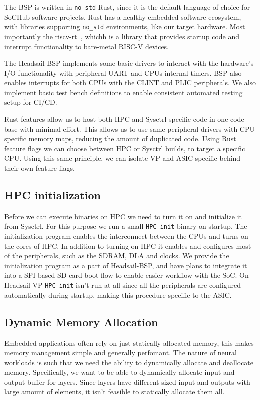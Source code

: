 \documentclass[12pt,a4paper,english
]{tunithesis}
\begin{document}
The BSP is written in \texttt{no\_std} Rust, since it is the default language of choice for SoCHub software projects. Rust has a healthy embedded software ecosystem, with libraries supporting \texttt{no\_std} environments, like our target hardware. Most importantly the riscv-rt~\cite{riscv_rt}, whichh is a library that provides startup code and interrupt functionality to bare-metal RISC-V devices.

The Headsail-BSP implements some basic drivers to interact with the hardware's I/O functionality with peripheral UART and CPUs internal timers. BSP also enables interrupts for both CPUs with the CLINT and PLIC peripherals. We also implement basic test bench definitions to enable consistent automated testing setup for CI/CD.

Rust features allow us to host both HPC and Sysctrl specific code in one code base with minimal effort. This allows us to use same peripheral drivers with CPU specific memory maps, reducing the amount of duplicated code. Using Rust feature flags we can choose between HPC or Sysctrl builds, to target a specific CPU. Using this same principle, we can isolate VP and ASIC specific behind their own feature flags.

\subsection{HPC initialization}
Before we can execute binaries on HPC we need to turn it on and initialize it from Sysctrl. For this purpose we run a small \texttt{HPC-init} binary on startup. The initialization program enables the interconnect between the CPUs and turns on the cores of HPC. In addition to turning on HPC it enables and configures most of the peripherals, such as the SDRAM, DLA and clocks.
We provide the initialization program as a part of Headsail-BSP, and have plans to integrate it into a SPI based SD-card boot flow to enable easier workflow with the SoC.
On Headsail-VP \texttt{HPC-init} isn't run at all since all the peripherals are configured automatically during startup, making this procedure specific to the ASIC.

\subsection{Dynamic Memory Allocation}
Embedded applications often rely on just statically allocated memory, this makes memory management simple and generally perfomant. The nature of neural workloads is such that we need the ability to dynamically allocate and deallocate memory. Specifically, we want to be able to dynamically allocate input and output buffer for layers. Since layers have different sized input and outputs with large amount of elements, it isn't feasible to statically allocate them all.
\end{document}
